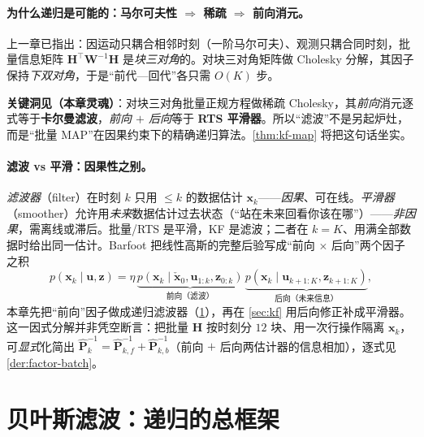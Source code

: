\paragraph{为什么递归是可能的：马尔可夫性 $\Rightarrow$ 稀疏 $\Rightarrow$ 前向消元。}
上一章已指出：因运动只耦合相邻时刻（一阶马尔可夫）、观测只耦合同时刻，批量信息矩阵 $\mathbf{H}^\top\mathbf{W}^{-1}\mathbf{H}$ 是\emph{块三对角}的。对块三对角矩阵做 Cholesky 分解，其因子保持\emph{下双对角}，于是“前代—回代”各只需 $O(K)$ 步\cite{barfoot2024state}。
\begin{insight}
\textbf{关键洞见（本章灵魂）}：对块三对角批量正规方程做稀疏 Cholesky，其\emph{前向}消元逐式等于\textbf{卡尔曼滤波}，\emph{前向 $+$ 后向}等于 \textbf{RTS 平滑器}。所以“滤波”不是另起炉灶，而是“批量 MAP”在因果约束下的精确递归算法。\cref{thm:kf-map} 将把这句话坐实。
\end{insight}

\paragraph{滤波 vs 平滑：因果性之别。}
\emph{滤波器}（filter）在时刻 $k$ 只用 $\le k$ 的数据估计 $\mathbf{x}_k$——\emph{因果}、可在线。\emph{平滑器}（smoother）允许用\emph{未来}数据估计过去状态（“站在未来回看你该在哪”）——\emph{非因果}，需离线或滞后。批量/RTS 是平滑，KF 是滤波；二者在 $k=K$、用满全部数据时给出同一估计。Barfoot\cite{barfoot2024state} 把线性高斯的完整后验写成“前向 $\times$ 后向”两个因子之积
\begin{equation}
  p(\mathbf{x}_k\mid\mathbf{u},\mathbf{z})=\eta\,
  \underbrace{p(\mathbf{x}_k\mid\check{\mathbf{x}}_0,\mathbf{u}_{1:k},\mathbf{z}_{0:k})}_{\text{前向（滤波）}}\,
  \underbrace{p(\mathbf{x}_k\mid\mathbf{u}_{k+1:K},\mathbf{z}_{k+1:K})}_{\text{后向（未来信息）}},
  \label{eq:eskf-fwd-bwd}
\end{equation}
本章先把“前向”因子做成递归滤波器（\cref{sec:bayes-filter}），再在 \cref{sec:kf} 用后向修正补成平滑器。这一因式分解并非凭空断言：把批量 $\mathbf{H}$ 按时刻分 $12$ 块、用一次行操作隔离 $\mathbf{x}_k$，可\emph{显式}化简出 $\hat{\mathbf{P}}_k^{-1}=\hat{\mathbf{P}}_{k,f}^{-1}+\hat{\mathbf{P}}_{k,b}^{-1}$（前向 $+$ 后向两估计器的信息相加），逐式见 \cref{der:factor-batch}。

\section{贝叶斯滤波：递归的总框架}
\label{sec:bayes-filter}

